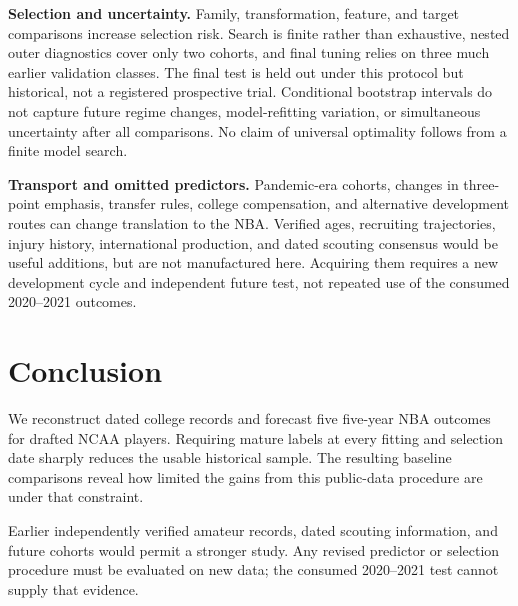 \documentclass[11pt]{article}
\begin{document}
\textbf{Selection and uncertainty.} Family, transformation, feature, and target comparisons increase selection risk. Search is finite rather than exhaustive, nested outer diagnostics cover only two cohorts, and final tuning relies on three much earlier validation classes. The final test is held out under this protocol but historical, not a registered prospective trial. Conditional bootstrap intervals do not capture future regime changes, model-refitting variation, or simultaneous uncertainty after all comparisons. No claim of universal optimality follows from a finite model search.

\textbf{Transport and omitted predictors.} Pandemic-era cohorts, changes in three-point emphasis, transfer rules, college compensation, and alternative development routes can change translation to the NBA. Verified ages, recruiting trajectories, injury history, international production, and dated scouting consensus would be useful additions, but are not manufactured here. Acquiring them requires a new development cycle and independent future test, not repeated use of the consumed 2020--2021 outcomes.

\section{Conclusion}
We reconstruct dated college records and forecast five five-year NBA outcomes for drafted NCAA players. Requiring mature labels at every fitting and selection date sharply reduces the usable historical sample. The resulting baseline comparisons reveal how limited the gains from this public-data procedure are under that constraint.



Earlier independently verified amateur records, dated scouting information, and future cohorts would permit a stronger study. Any revised predictor or selection procedure must be evaluated on new data; the consumed 2020--2021 test cannot supply that evidence.
\end{document}

